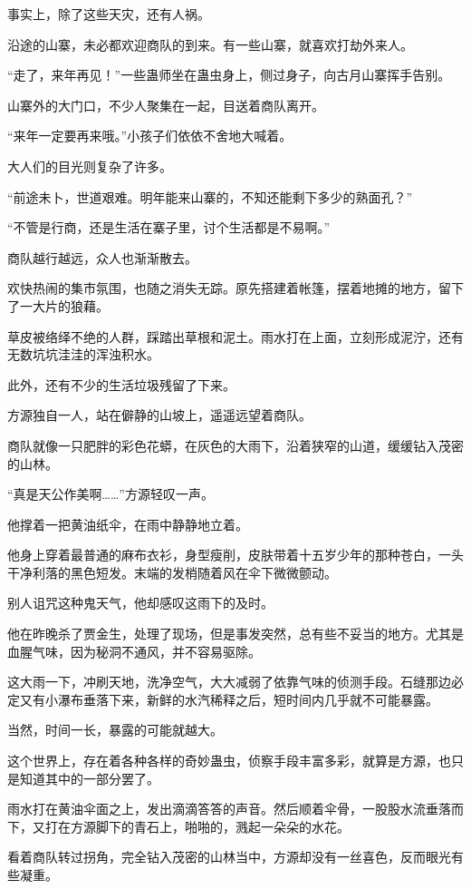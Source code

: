 \begin{this_body}
事实上，除了这些天灾，还有人祸。

沿途的山寨，未必都欢迎商队的到来。有一些山寨，就喜欢打劫外来人。

“走了，来年再见！”一些蛊师坐在蛊虫身上，侧过身子，向古月山寨挥手告别。

山寨外的大门口，不少人聚集在一起，目送着商队离开。

“来年一定要再来哦。”小孩子们依依不舍地大喊着。

大人们的目光则复杂了许多。

“前途未卜，世道艰难。明年能来山寨的，不知还能剩下多少的熟面孔？”

“不管是行商，还是生活在寨子里，讨个生活都是不易啊。”

商队越行越远，众人也渐渐散去。

欢快热闹的集市氛围，也随之消失无踪。原先搭建着帐篷，摆着地摊的地方，留下了一大片的狼藉。

草皮被络绎不绝的人群，踩踏出草根和泥土。雨水打在上面，立刻形成泥泞，还有无数坑坑洼洼的浑浊积水。

此外，还有不少的生活垃圾残留了下来。

方源独自一人，站在僻静的山坡上，遥遥远望着商队。

商队就像一只肥胖的彩色花蟒，在灰色的大雨下，沿着狭窄的山道，缓缓钻入茂密的山林。

“真是天公作美啊……”方源轻叹一声。

他撑着一把黄油纸伞，在雨中静静地立着。

他身上穿着最普通的麻布衣衫，身型瘦削，皮肤带着十五岁少年的那种苍白，一头干净利落的黑色短发。末端的发梢随着风在伞下微微颤动。

别人诅咒这种鬼天气，他却感叹这雨下的及时。

他在昨晚杀了贾金生，处理了现场，但是事发突然，总有些不妥当的地方。尤其是血腥气味，因为秘洞不通风，并不容易驱除。

这大雨一下，冲刷天地，洗净空气，大大减弱了依靠气味的侦测手段。石缝那边必定又有小瀑布垂落下来，新鲜的水汽稀释之后，短时间内几乎就不可能暴露。

当然，时间一长，暴露的可能就越大。

这个世界上，存在着各种各样的奇妙蛊虫，侦察手段丰富多彩，就算是方源，也只是知道其中的一部分罢了。

雨水打在黄油伞面之上，发出滴滴答答的声音。然后顺着伞骨，一股股水流垂落而下，又打在方源脚下的青石上，啪啪的，溅起一朵朵的水花。

看着商队转过拐角，完全钻入茂密的山林当中，方源却没有一丝喜色，反而眼光有些凝重。


\end{this_body}
